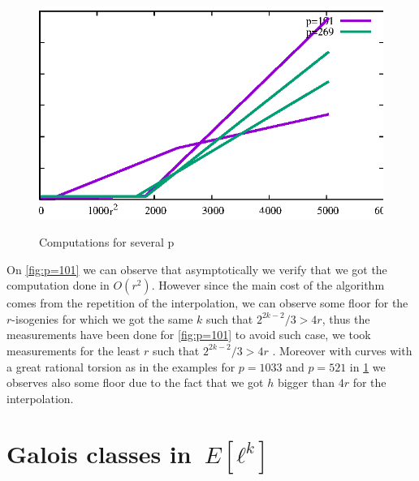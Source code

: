 \documentclass{lms}
\begin{document}
\begin{figure}
\centering\label{fig:several p}
\includegraphics[scale=1]{Code/creat2.eps}
\caption{Computations for several p}
\end{figure}
On \ref{fig:p=101} we can observe that asymptotically we verify that we got the computation done in $O(r^2)$. However since the main cost of the algorithm comes from the repetition of the interpolation, we can observe some floor for the $r$-isogenies for which we got the same $k$ such that $2^{2k-2}/3>4r$, thus the measurements have been done for \ref{fig:p=101} to avoid such case, we took measurements for the least $r$ such that $2^{2k-2}/3>4r$ . Moreover with curves with a great rational torsion as in the examples for $p=1033$ and $p=521$ in \ref{fig:several p} we observes also some floor due to the fact that we got $h$ bigger than $4r$ for the interpolation. 





\appendix

\section{Galois classes in~$E[ℓ^k]$}
\label{ap:galois}
\end{document}
